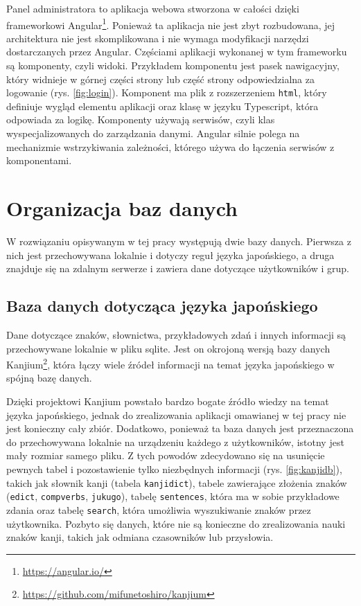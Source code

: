 \documentclass[a4paper,twoside,12pt]{book}
\begin{document}
Panel administratora to aplikacja webowa stworzona w całości dzięki frameworkowi Angular\footnote{\url{https://angular.io/}}. Ponieważ ta aplikacja nie jest zbyt rozbudowana, jej architektura nie jest skomplikowana i nie wymaga modyfikacji narzędzi dostarczanych przez Angular. Częściami aplikacji wykonanej w tym frameworku są komponenty, czyli widoki. Przykładem komponentu jest pasek nawigacyjny, który widnieje w górnej części strony lub część strony odpowiedzialna za logowanie (rys. \ref{fig:login}). Komponent ma plik z rozszerzeniem \texttt{html}, który definiuje wygląd elementu aplikacji oraz klasę w języku Typescript, która odpowiada za logikę. Komponenty używają serwisów, czyli klas wyspecjalizowanych do zarządzania danymi. Angular silnie polega na mechanizmie wstrzykiwania zależności, którego używa do łączenia serwisów z komponentami. 

\section{Organizacja baz danych}

W rozwiązaniu opisywanym w tej pracy występują dwie bazy danych. Pierwsza z nich jest przechowywana lokalnie i dotyczy reguł języka japońskiego, a druga znajduje się na zdalnym serwerze i zawiera dane dotyczące użytkowników i grup.

\subsection{Baza danych dotycząca języka japońskiego}
\label{sec:3}

Dane dotyczące znaków, słownictwa, przykładowych zdań i innych informacji są przechowywane lokalnie w pliku sqlite. Jest on okrojoną wersją bazy danych Kanjium\footnote{\url{https://github.com/mifunetoshiro/kanjium}}, która łączy wiele źródeł informacji na temat języka japońskiego w spójną bazę danych. 

Dzięki projektowi Kanjium powstało bardzo bogate źródło wiedzy na temat języka japońskiego, jednak do zrealizowania aplikacji omawianej w tej pracy nie jest konieczny cały zbiór. Dodatkowo, ponieważ ta baza danych jest przeznaczona do przechowywana lokalnie na urządzeniu każdego z użytkowników, istotny jest mały rozmiar samego pliku. Z tych powodów zdecydowano się na usunięcie pewnych tabel i pozostawienie tylko niezbędnych informacji (rys. \ref{fig:kanjidb}), takich jak słownik kanji (tabela \texttt{kanjidict}), tabele zawierające złożenia znaków (\texttt{edict}, \texttt{compverbs}, \texttt{jukugo}), tabelę \texttt{sentences}, która ma w sobie przykładowe zdania oraz tabelę \texttt{search}, która umożliwia wyszukiwanie znaków przez użytkownika. Pozbyto się danych, które nie są konieczne do zrealizowania nauki znaków kanji, takich jak odmiana czasowników lub przysłowia.
\end{document}
